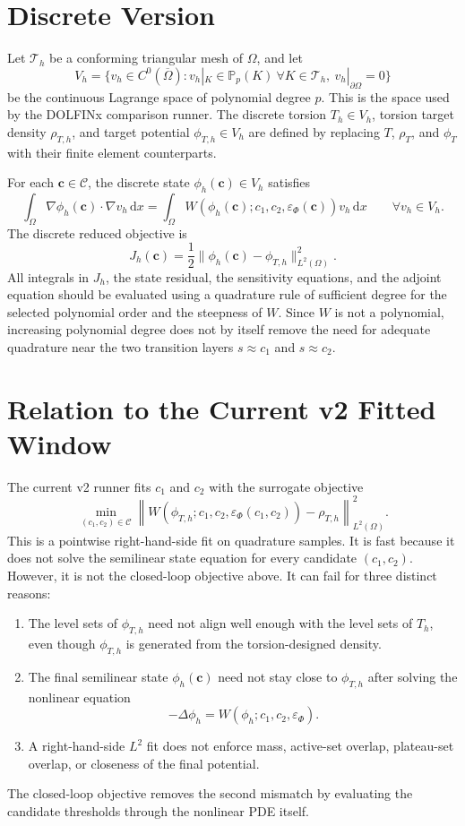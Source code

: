 \documentclass[11pt]{article}
\newcommand{\dd}{\,\mathrm d}
\newcommand{\OmegaD}{\Omega}
\newcommand{\W}{W}
\newcommand{\cvec}{\bm c}
\newcommand{\phit}{\phi_T}
\newcommand{\rhot}{\rho_T}
\newcommand{\epsp}{\varepsilon_\Phi}
\begin{document}
\section{Discrete Version}

Let \(\mathcal T_h\) be a conforming triangular mesh of \(\OmegaD\), and let
\[
  V_h
  =
  \{v_h\in C^0(\overline\OmegaD):
    v_h|_K\in\mathbb P_p(K)\ \forall K\in\mathcal T_h,\ 
    v_h|_{\partial\OmegaD}=0\}
\]
be the continuous Lagrange space of polynomial degree \(p\).  This is the
space used by the DOLFINx comparison runner.  The discrete torsion
\(T_h\in V_h\), torsion target density \(\rho_{T,h}\), and target potential
\(\phi_{T,h}\in V_h\) are defined by replacing \(T\), \(\rhot\), and \(\phit\)
with their finite element counterparts.

For each \(\cvec\in\mathcal C\), the discrete state
\(\phi_h(\cvec)\in V_h\) satisfies
\[
  \int_{\OmegaD}\nabla\phi_h(\cvec)\cdot\nabla v_h\dd x
  =
  \int_{\OmegaD}
    \W(\phi_h(\cvec);c_1,c_2,\epsp(\cvec))v_h
  \dd x
  \qquad
  \forall v_h\in V_h.
\]
The discrete reduced objective is
\[
  J_h(\cvec)
  =
  \frac{1}{2}
  \|\phi_h(\cvec)-\phi_{T,h}\|_{L^2(\OmegaD)}^2.
\]
All integrals in \(J_h\), the state residual, the sensitivity equations, and
the adjoint equation should be evaluated using a quadrature rule of sufficient
degree for the selected polynomial order and the steepness of
\(\W\).  Since \(\W\) is not a polynomial, increasing polynomial degree does
not by itself remove the need for adequate quadrature near the two transition
layers \(s\approx c_1\) and \(s\approx c_2\).

\section{Relation to the Current v2 Fitted Window}

The current v2 runner fits \(c_1\) and \(c_2\) with the surrogate objective
\[
  \min_{(c_1,c_2)\in\mathcal C}
  \left\|
    \W(\phi_{T,h};c_1,c_2,\epsp(c_1,c_2))
    -
    \rho_{T,h}
  \right\|_{L^2(\OmegaD)}^2.
\]
This is a pointwise right-hand-side fit on quadrature samples.  It is fast
because it does not solve the semilinear state equation for every candidate
\((c_1,c_2)\).  However, it is not the closed-loop objective above.  It can
fail for three distinct reasons:
\begin{enumerate}[label=(\roman*)]
  \item The level sets of \(\phi_{T,h}\) need not align well enough with the
  level sets of \(T_h\), even though \(\phi_{T,h}\) is generated from the
  torsion-designed density.
  \item The final semilinear state \(\phi_h(\cvec)\) need not stay close to
  \(\phi_{T,h}\) after solving the nonlinear equation
  \[
    -\Delta\phi_h=\W(\phi_h;c_1,c_2,\epsp).
  \]
  \item A right-hand-side \(L^2\) fit does not enforce mass, active-set
  overlap, plateau-set overlap, or closeness of the final potential.
\end{enumerate}
The closed-loop objective removes the second mismatch by evaluating the
candidate thresholds through the nonlinear PDE itself.
\end{document}
